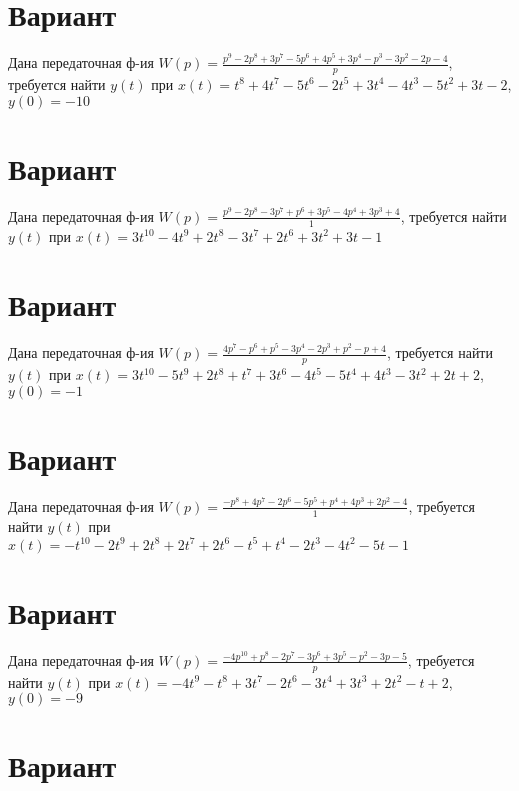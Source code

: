 \documentclass{article}
\begin{document}
\section{Вариант}

Дана передаточная ф-ия $W(p)=\frac{p^{9}-2p^{8}+3p^{7}-5p^{6}+4p^{5}+3p^{4}-p^{3}-3p^{2}-2p-4}{p}$, требуется найти $y(t)$ при $x(t)=t^{8}+4t^{7}-5t^{6}-2t^{5}+3t^{4}-4t^{3}-5t^{2}+3t-2$, $y(0)=-10$



\section{Вариант}

Дана передаточная ф-ия $W(p)=\frac{p^{9}-2p^{8}-3p^{7}+p^{6}+3p^{5}-4p^{4}+3p^{3}+4}{1}$, требуется найти $y(t)$ при $x(t)=3t^{10}-4t^{9}+2t^{8}-3t^{7}+2t^{6}+3t^{2}+3t-1$



\section{Вариант}

Дана передаточная ф-ия $W(p)=\frac{4p^{7}-p^{6}+p^{5}-3p^{4}-2p^{3}+p^{2}-p+4}{p}$, требуется найти $y(t)$ при $x(t)=3t^{10}-5t^{9}+2t^{8}+t^{7}+3t^{6}-4t^{5}-5t^{4}+4t^{3}-3t^{2}+2t+2$, $y(0)=-1$



\section{Вариант}

Дана передаточная ф-ия $W(p)=\frac{-p^{8}+4p^{7}-2p^{6}-5p^{5}+p^{4}+4p^{3}+2p^{2}-4}{1}$, требуется найти $y(t)$ при $x(t)=-t^{10}-2t^{9}+2t^{8}+2t^{7}+2t^{6}-t^{5}+t^{4}-2t^{3}-4t^{2}-5t-1$



\section{Вариант}

Дана передаточная ф-ия $W(p)=\frac{-4p^{10}+p^{8}-2p^{7}-3p^{6}+3p^{5}-p^{2}-3p-5}{p}$, требуется найти $y(t)$ при $x(t)=-4t^{9}-t^{8}+3t^{7}-2t^{6}-3t^{4}+3t^{3}+2t^{2}-t+2$, $y(0)=-9$



\section{Вариант}
\end{document}

